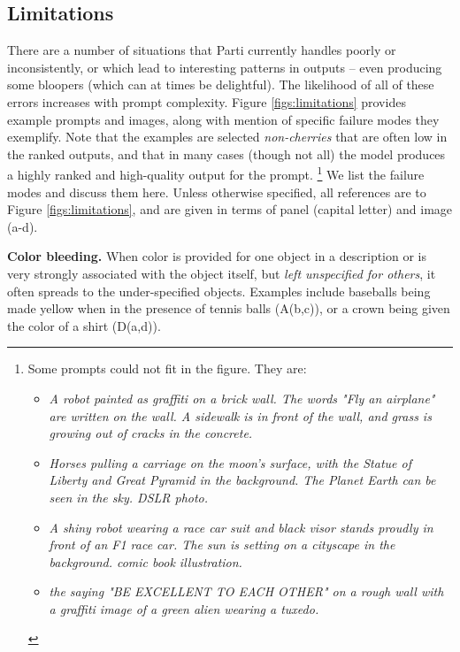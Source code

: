 \subsection{Limitations}
\label{secs:limitations}

There are a number of situations that Parti currently handles poorly or inconsistently, or which lead to interesting patterns in outputs -- even producing some bloopers (which can at times be delightful). The likelihood of all of these errors increases with prompt complexity. Figure \ref{figs:limitations} provides example prompts and images, along with mention of specific failure modes they exemplify. Note that the examples are selected \textit{non-cherries} that are often low in the ranked outputs, and that in many cases (though not all) the model produces a highly ranked and high-quality output for the prompt. \footnote{Some prompts could not fit in the figure. They are:

\begin{itemize}[itemsep=0.5pt]
    \item[\textbf{H(a,b)}] \textit{A robot painted as graffiti on a brick wall. The words "Fly an airplane" are written on the wall. A sidewalk is in front of the wall, and grass is growing out of cracks in the concrete.}
    \item[\textbf{I(a,b)}] \textit{Horses pulling a carriage on the moon's surface, with the Statue of Liberty and Great Pyramid in the background. The Planet Earth can be seen in the sky. DSLR photo.}
    \item[\textbf{I(c)}] \textit{A shiny robot wearing a race car suit and black visor stands proudly in front of an F1 race car. The sun is setting on a cityscape in the background. comic book illustration.}
    \item[\textbf{I(d)}] \textit{the saying "BE EXCELLENT TO EACH OTHER" on a rough wall with a graffiti image of a green alien wearing a tuxedo.} \end{itemize}

} We list the failure modes and discuss them here. Unless otherwise specified, all references are to Figure \ref{figs:limitations}, and are given in terms of panel (capital letter) and image (a-d).

\textbf{Color bleeding.} When color is provided for one object in a description or is very strongly associated with the object itself, but \textit{left unspecified for others}, it often spreads to the under-specified objects. Examples include baseballs being made yellow when in the presence of tennis balls (A(b,c)), or a crown being given the color of a shirt (D(a,d)).

